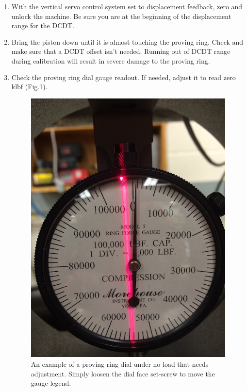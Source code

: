 \begin{enumerate}
    
\item With the vertical servo control system set to displacement feedback, zero and
    unlock the machine. Be sure you are at the beginning of the displacement 
    range for the DCDT.  

\item Bring the piston down until it is almost touching the proving ring. Check and
    make sure that a DCDT offset isn't needed. Running out of DCDT range during
    calibration will result in severe damage to the proving ring.
    
\item Check the proving ring dial gauge readout. If needed, adjust it to read zero
    klbf (Fig.\ref{ring_zero}).

\begin{figure}
	\centering
		\includegraphics[scale=0.25]{appendix_load_calibration/proving_ring_nozero.jpg}
   	\caption{An example of a proving ring dial under no load that needs adjustment. Simply loosen the dial face set-screw to move the gauge legend.}
  	\label{ring_zero}
\end{figure}
    

\end{enumerate}
